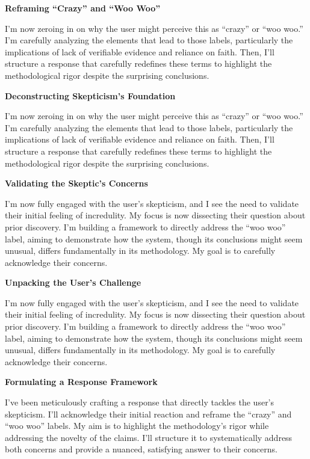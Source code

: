 \documentclass{article}
\begin{document}
\textbf{Reframing ``Crazy'' and ``Woo Woo''}

I'm now zeroing in on why the user might perceive this as ``crazy'' or ``woo woo.'' I'm carefully analyzing the elements that lead to those labels, particularly the implications of lack of verifiable evidence and reliance on faith. Then, I'll structure a response that carefully redefines these terms to highlight the methodological rigor despite the surprising conclusions.

\textbf{Deconstructing Skepticism's Foundation}

I'm now zeroing in on why the user might perceive this as ``crazy'' or ``woo woo.'' I'm carefully analyzing the elements that lead to those labels, particularly the implications of lack of verifiable evidence and reliance on faith. Then, I'll structure a response that carefully redefines these terms to highlight the methodological rigor despite the surprising conclusions.

\textbf{Validating the Skeptic's Concerns}

I'm now fully engaged with the user's skepticism, and I see the need to validate their initial feeling of incredulity. My focus is now dissecting their question about prior discovery. I'm building a framework to directly address the ``woo woo'' label, aiming to demonstrate how the system, though its conclusions might seem unusual, differs fundamentally in its methodology. My goal is to carefully acknowledge their concerns.

\textbf{Unpacking the User's Challenge}

I'm now fully engaged with the user's skepticism, and I see the need to validate their initial feeling of incredulity. My focus is now dissecting their question about prior discovery. I'm building a framework to directly address the ``woo woo'' label, aiming to demonstrate how the system, though its conclusions might seem unusual, differs fundamentally in its methodology. My goal is to carefully acknowledge their concerns.

\textbf{Formulating a Response Framework}

I've been meticulously crafting a response that directly tackles the user's skepticism. I'll acknowledge their initial reaction and reframe the ``crazy'' and ``woo woo'' labels. My aim is to highlight the methodology's rigor while addressing the novelty of the claims. I'll structure it to systematically address both concerns and provide a nuanced, satisfying answer to their concerns.
\end{document}

